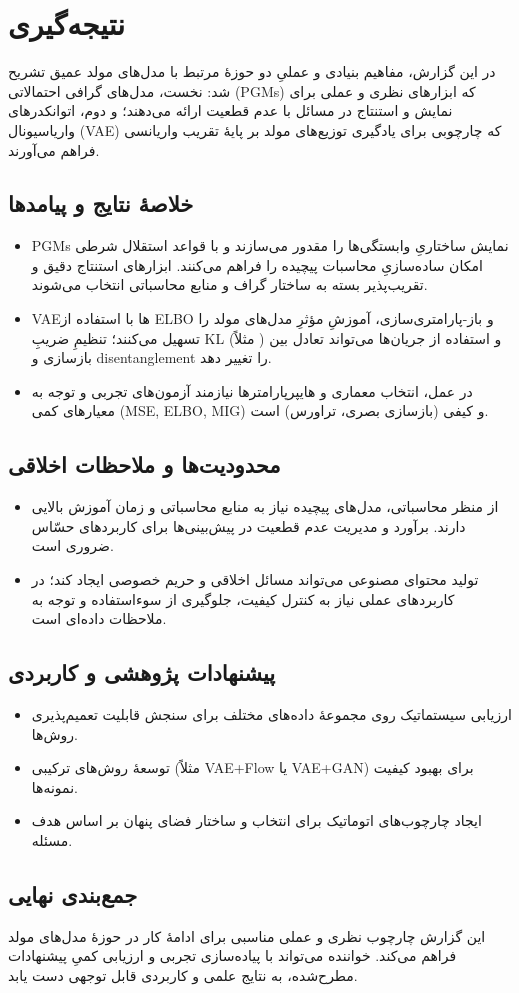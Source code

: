 \chapter{نتیجه‌گیری}

در این گزارش، مفاهیم بنیادی و عملیِ دو حوزهٔ مرتبط با مدل‌های مولد عمیق تشریح شد: نخست، مدل‌های گرافی احتمالاتی (PGMs) که ابزارهای نظری و عملی برای نمایش و استنتاج در مسائل با عدم قطعیت ارائه می‌دهند؛ و دوم، اتوانکدرهای واریاسیونال (VAE) که چارچوبی برای یادگیری توزیع‌های مولد بر پایهٔ تقریب واریانسی فراهم می‌آورند.

\section{خلاصهٔ نتایج و پیامدها}
\begin{itemize}
    \item PGMs نمایش ساختاریِ وابستگی‌ها را مقدور می‌سازند و با قواعد استقلال شرطی امکان ساده‌سازیِ محاسبات پیچیده را فراهم می‌کنند. ابزارهای استنتاج دقیق و تقریب‌پذیر بسته به ساختار گراف و منابع محاسباتی انتخاب می‌شوند.
    \item VAEها با استفاده از ELBO و باز-پارامتری‌سازی، آموزشِ مؤثرِ مدل‌های مولد را تسهیل می‌کنند؛ تنظیمِ ضریبِ KL (مثلاً \beta) و استفاده از جریان‌ها می‌تواند تعادل بین بازسازی و disentanglement را تغییر دهد.
    \item در عمل، انتخاب معماری و هایپرپارامترها نیازمند آزمون‌های تجربی و توجه به معیارهای کمی (MSE, ELBO, MIG) و کیفی (بازسازی بصری، تراورس) است.
\end{itemize}

\section{محدودیت‌ها و ملاحظات اخلاقی}
\begin{itemize}
    \item از منظر محاسباتی، مدل‌های پیچیده نیاز به منابع محاسباتی و زمان آموزش بالایی دارند. برآورد و مدیریت عدم قطعیت در پیش‌بینی‌ها برای کاربردهای حسّاس ضروری است.
    \item تولید محتوای مصنوعی می‌تواند مسائل اخلاقی و حریم خصوصی ایجاد کند؛ در کاربردهای عملی نیاز به کنترل کیفیت، جلوگیری از سوءاستفاده و توجه به ملاحظات داده‌ای است.
\end{itemize}

\section{پیشنهادات پژوهشی و کاربردی}
\begin{itemize}
    \item ارزیابی سیستماتیک روی مجموعهٔ داده‌های مختلف برای سنجش قابلیت تعمیم‌پذیری روش‌ها.
    \item توسعهٔ روش‌های ترکیبی (مثلاً VAE+Flow یا VAE+GAN) برای بهبود کیفیت نمونه‌ها.
    \item ایجاد چارچوب‌های اتوماتیک برای انتخاب \beta و ساختار فضای پنهان بر اساس هدف مسئله.
\end{itemize}

\section{جمع‌بندی نهایی}
این گزارش چارچوب نظری و عملی مناسبی برای ادامهٔ کار در حوزهٔ مدل‌های مولد فراهم می‌کند. خواننده می‌تواند با پیاده‌سازی تجربی و ارزیابی کمیِ پیشنهادات مطرح‌شده، به نتایج علمی و کاربردی قابل توجهی دست یابد.
